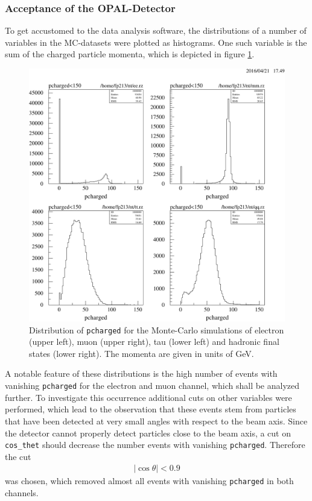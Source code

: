 \documentclass[11pt, a4paper]{article}
\numberwithin{equation}{section}
\begin{document}
\subsubsection{Acceptance of the OPAL-Detector}
\label{sec:acceptance_detector}
To get accustomed to the data analysis software, the distributions of a number of variables in the MC-datasets were plotted as histograms.
One such variable is the sum of the charged particle momenta, which is depicted in figure \ref{fig:uncut_pcharged}.
\begin{figure}[h]
	\centering
	\includegraphics[width=1.0\textwidth]{./data/tag2/uncut/cropped/pcharged_uncut.pdf}
	\caption{Distribution of \texttt{pcharged} for the Monte-Carlo simulations of electron (upper left), muon (upper right), tau (lower left) and hadronic final states (lower right). The momenta are given in units of GeV.}
	\label{fig:uncut_pcharged}
\end{figure}
A notable feature of these distributions is the high number of events with vanishing \texttt{pcharged} for the electron and muon channel, which shall be analyzed further.
To investigate this occurrence additional cuts on other variables were performed, which lead to the observation that these events stem from particles that have been detected at very small angles with respect to the beam axis.
Since the detector cannot properly detect particles close to the beam axis, a cut on \texttt{cos\_thet} should decrease the number events with vanishing \texttt{pcharged}.
Therefore the cut
\begin{align*}
	\left| \cos\theta \right| < 0.9
\end{align*}
was chosen, which removed almost all events with vanishing \texttt{pcharged} in both channels.
\end{document}

